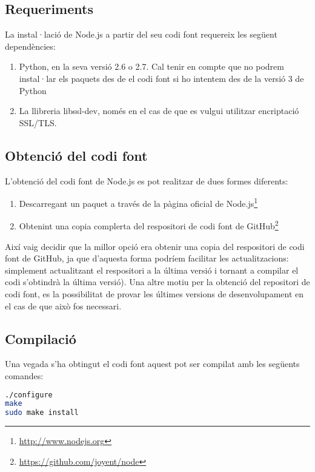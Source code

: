 \subsection{Requeriments}

La instal·lació de Node.js a partir del seu codi font requereix les següent dependències:

\begin{enumerate}
    \item{Python, en la seva versió 2.6 o 2.7. Cal tenir en compte que no podrem instal·lar els paquets des de el codi font si ho intentem des de la versió 3 de Python}
    \item{La llibreria libssl-dev, només en el cas de que es vulgui utilitzar encriptació SSL/TLS. }
\end{enumerate}

\subsection{Obtenció del codi font}

L'obtenció del codi font de Node.js es pot realitzar de dues formes diferents: 

\begin{enumerate}
    \item{Descarregant un paquet a través de la pàgina oficial de Node.js\footnote{\url{http://www.nodejs.org}}}
    \item{Obtenint una copia complerta del respositori de codi font de GitHub\footnote{\url{https://github.com/joyent/node}}}
\end{enumerate}

Així vaig decidir que la millor opció era obtenir una copia del respositori de codi font de GitHub, ja que d'aquesta forma podríem facilitar les actualitzacions: simplement actualitzant el respositori a la última versió i tornant a compilar el codi s'obtindrà la última versió). Una altre motiu per la obtenció del repositori de codi font, es la possibilitat de provar les últimes versions de desenvolupament en el cas de que això fos necessari.  

\subsection{Compilació}

Una vegada s'ha obtingut el codi font aquest pot ser compilat amb les següents comandes:  
\begin{lstlisting}[language=bash]
./configure
make
sudo make install
\end{lstlisting}

